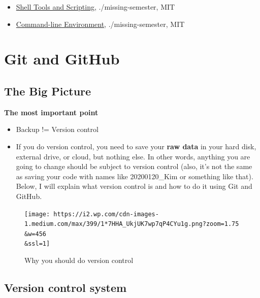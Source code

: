 \documentclass[
  letterpaper,
  DIV=11,
  numbers=noendperiod]{scrreprt}
\begin{document}
\begin{itemize}
\item
  \href{https://missing.csail.mit.edu/2020/shell-tools/}{Shell Tools and
  Scripting}, ./missing-semester, MIT
\item
  \href{https://missing.csail.mit.edu/2020/command-line/}{Command-line
  Environment}, ./missing-semester, MIT
\end{itemize}

\hypertarget{git-and-github}{%
\section*{Git and GitHub}\label{git-and-github}}

\hypertarget{the-big-picture-1}{%
\subsection*{The Big Picture}\label{the-big-picture-1}}

\textbf{The most important point}

\begin{itemize}
\item
  Backup != Version control
\item
  If you do version control, you need to save your \textbf{raw data} in
  your hard disk, external drive, or cloud, but nothing else. In other
  words, anything you are going to change should be subject to version
  control (also, it's not the same as saving your code with names like
  20200120\_Kim or something like that). Below, I will explain what
  version control is and how to do it using Git and GitHub.
\end{itemize}

\begin{figure}

{\centering \texttt{[image: https://i2.wp.com/cdn-images-1.medium.com/max/399/1*7HHA\_UkjUK7wp7qP4CYu1g.png?zoom=1.75\\\&w=456\\\&ssl=1]}

}

\caption{Why you should do version control}

\end{figure}

\hypertarget{version-control-system}{%
\subsection*{Version control system}\label{version-control-system}}
\end{document}
